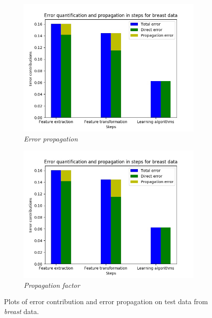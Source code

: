 \begin{figure}[H]
\begin{subfigure}{.5\textwidth}
  \centering
  \includegraphics[scale=0.4]{img/EP/error_propagation_random_pipeline_steps_test_breast}
  \caption{\textit{Error propagation}}
  \label{fig:sfig4}
\end{subfigure}%
\begin{subfigure}{.5\textwidth}
  \centering
  \includegraphics[scale=0.4]{img/EP/error_propagation_random_pipeline_steps_test_breast}
  \caption{\textit{Propagation factor}}
  \label{fig:sfig4}
\end{subfigure}
\caption{Plots of error contribution and error propagation on test data from \textit{breast} data.}
\label{fig:fig}
\end{figure}


